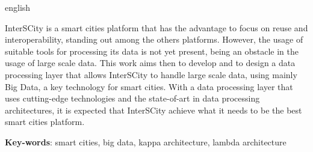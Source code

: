 \begin{resumo}[Abstract]
 \begin{otherlanguage*}{english}

     InterSCity is a smart cities platform that has the advantage to focus
     on reuse and interoperability, standing out among the others platforms.
     However, the usage of suitable tools for processing its data is not yet
     present, being an obstacle in the usage of large scale data.
     This work aims then to develop and to design a data processing layer that
     allows InterSCity to handle large scale data, using mainly Big Data, a key
     technology for smart cities.
     With a data processing layer that uses cutting-edge technologies and the
     state-of-art in data processing architectures, it is expected that InterSCity
     achieve what it needs to be the best smart cities platform.

   \vspace{\onelineskip}
 
   \noindent 
   \textbf{Key-words}: smart cities, big data, kappa architecture, lambda architecture
 \end{otherlanguage*}
\end{resumo}
